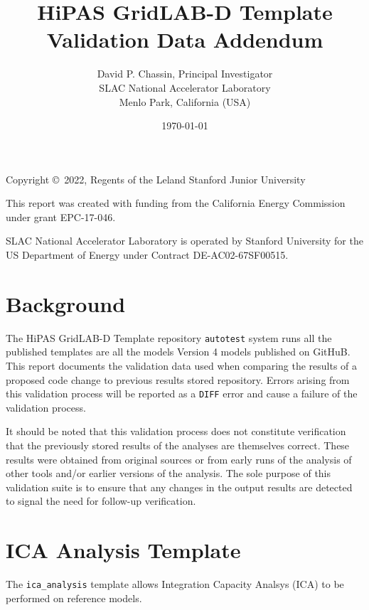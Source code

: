 \documentclass{article}
\title
{
	HiPAS GridLAB-D Template Validation Data Addendum
}
\author
{
	David P. Chassin, Principal Investigator
\\
	SLAC National Accelerator Laboratory
\\
	Menlo Park, California (USA) 
}
\date { \today }
\def\code#1{\texttt{#1}}
\begin{document}
\maketitle

{
	\center 
	
	Copyright \copyright\ 2022, Regents of the Leland Stanford Junior University

\vspace{1cm}

	This report was created with funding from the California Energy Commission under grant EPC-17-046.

\vspace{1cm}

	SLAC National Accelerator Laboratory is operated by Stanford University for the US Department of Energy
	under Contract DE-AC02-67SF00515.
}

\newpage

\tableofcontents

\newpage

\listoftables

\newpage

\section{Background}

The HiPAS GridLAB-D Template repository \code{autotest} system runs all the published templates are all the models Version 4 models published on GitHuB. This report documents the validation data used when comparing the results of a proposed code change to previous results stored repository. Errors arising from this validation process will be reported as a \code{DIFF} error and cause a failure of the validation process.

It should be noted that this validation process does not constitute verification that the previously stored results of the analyses are themselves correct. These results were obtained from original sources or from early runs of the analysis of other tools and/or earlier versions of the analysis.  The sole purpose of this validation suite is to ensure that any changes in the output results are detected to signal the need for follow-up verification.

\section{ICA Analysis Template}

The \code{ica\_analysis} template allows Integration Capacity Analsys (ICA) to be performed on reference models. 
\end{document}
